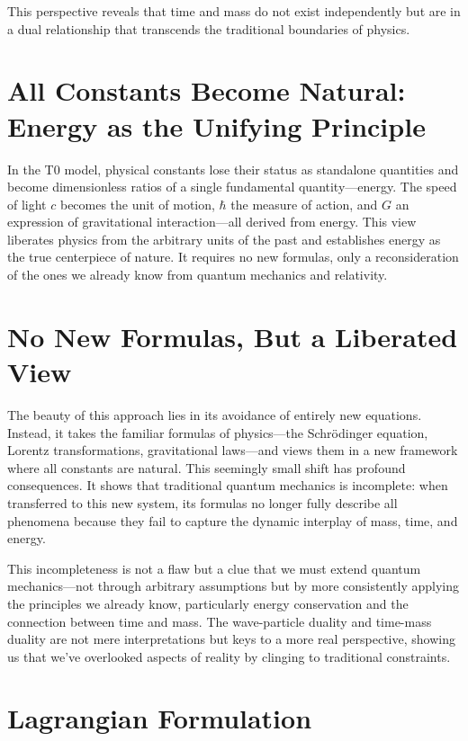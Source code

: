 \documentclass[a4paper,12pt]{article}
\begin{document}
	This perspective reveals that time and mass do not exist independently but are in a dual relationship that transcends the traditional boundaries of physics.
	
	\section{All Constants Become Natural: Energy as the Unifying Principle}
	
	In the T0 model, physical constants lose their status as standalone quantities and become dimensionless ratios of a single fundamental quantity—energy. The speed of light \(c\) becomes the unit of motion, \(\hbar\) the measure of action, and \(G\) an expression of gravitational interaction—all derived from energy. This view liberates physics from the arbitrary units of the past and establishes energy as the true centerpiece of nature. It requires no new formulas, only a reconsideration of the ones we already know from quantum mechanics and relativity.
	
	\section{No New Formulas, But a Liberated View}
	
	The beauty of this approach lies in its avoidance of entirely new equations. Instead, it takes the familiar formulas of physics—the Schrödinger equation, Lorentz transformations, gravitational laws—and views them in a new framework where all constants are natural. This seemingly small shift has profound consequences. It shows that traditional quantum mechanics is incomplete: when transferred to this new system, its formulas no longer fully describe all phenomena because they fail to capture the dynamic interplay of mass, time, and energy.
	
	This incompleteness is not a flaw but a clue that we must extend quantum mechanics—not through arbitrary assumptions but by more consistently applying the principles we already know, particularly energy conservation and the connection between time and mass. The wave-particle duality and time-mass duality are not mere interpretations but keys to a more real perspective, showing us that we’ve overlooked aspects of reality by clinging to traditional constraints.
	
	\section{Lagrangian Formulation}
	
\end{document}
